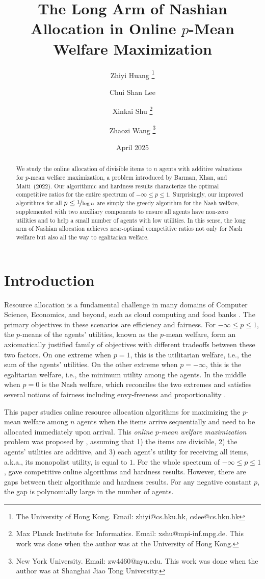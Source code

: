 \documentclass[11pt,letterpaper]{article}
\title{The Long Arm of Nashian Allocation in Online $p$-Mean Welfare Maximization}
\author{
	Zhiyi Huang
	\footnote{The University of Hong Kong. Email: zhiyi@cs.hku.hk, cslee@cs.hku.hk}
	\and
	Chui Shan Lee
	\footnotemark[1]
	\and
	Xinkai Shu
	\footnote{Max Planck Institute for Informatics. Email: xshu@mpi-inf.mpg.de. This work was done when the author was at the University of Hong Kong.}
	\and
	Zhaozi Wang
	\footnote{New York University. Email: zw4460@nyu.edu. This work was done when the author was at
Shanghai Jiao Tong University.}
}
\date{April 2025}
\begin{document}
\begin{titlepage}
	\thispagestyle{empty}
	\maketitle
	
	\begin{abstract}
		\thispagestyle{empty}
		We study the online allocation of divisible items to $n$ agents with additive valuations for $p$-mean welfare maximization, a problem introduced by Barman, Khan, and Maiti~(2022).
Our algorithmic and hardness results characterize the optimal competitive ratios for the entire spectrum of $-\infty \le p \le 1$.
Surprisingly, our improved algorithms for all $p \le \nicefrac{1}{\log n}$ are simply the greedy algorithm for the Nash welfare, supplemented with two auxiliary components to ensure all agents have non-zero utilities and to help a small number of agents with low utilities.
In this sense, the long arm of Nashian allocation achieves near-optimal competitive ratios not only for Nash welfare but also all the way to egalitarian welfare.
 	\end{abstract}
\end{titlepage}

\section{Introduction}

Resource allocation is a fundamental challenge in many domains of Computer Science, Economics, and beyond, such as cloud computing \citep[e.g.,][]{GhodsiZHKSS:NSDI:2011} and food banks \citep[e.g.,][]{AleksandrovAGW:IJCAI:2015}.
The primary objectives in these scenarios are efficiency and fairness.
For $-\infty \le p \le 1$, the $p$-means of the agents' utilities, known as the $p$-mean welfare, form an axiomatically justified family of objectives \citep[][Chapter 3]{Moulin:2004} with different tradeoffs between these two factors.
On one extreme when $p = 1$, this is the utilitarian welfare, i.e., the sum of the agents' utilities.
On the other extreme when $p = - \infty$, this is the egalitarian welfare, i.e., the minimum utility among the agents.
In the middle when $p = 0$ is the Nash welfare, which reconciles the two extremes and satisfies several notions of fairness including envy-freeness
and proportionality \citep{Varian:1974}.


This paper studies online resource allocation algorithms for maximizing the $p$-mean welfare among $n$ agents when the items arrive sequentially and need to be allocated immediately upon arrival.
This \emph{online $p$-mean welfare maximization} problem was proposed by \citet*{BarmanKM:AAAI:2022}, assuming that 1) the items are divisible, 2) the agents' utilities are additive, and 3) each agent's utility for receiving all items, a.k.a., its monopolist utility, is equal to $1$.
For the whole spectrum of $-\infty \le p \le 1$, \citet{BarmanKM:AAAI:2022} gave competitive online algorithms and hardness results. 
However, there are gaps between their algorithmic and hardness results.
For any negative constant $p$, the gap is polynomially large in the number of agents.
\end{document}
